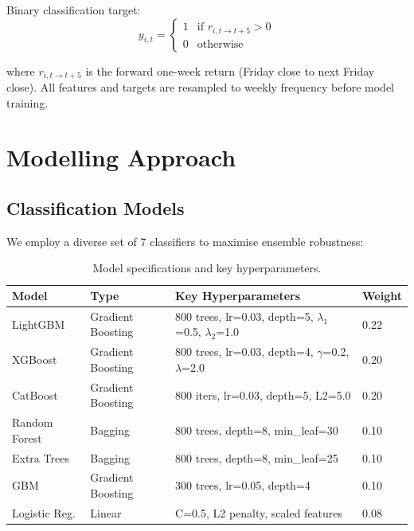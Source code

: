 \documentclass[12pt,a4paper]{article}
\begin{document}
Binary classification target:
\begin{equation}
    y_{i,t} = 
    \begin{cases}
        1 & \text{if } r_{i,t \to t+5} > 0 \\
        0 & \text{otherwise}
    \end{cases}
\end{equation}

where $r_{i,t \to t+5}$ is the forward one-week return (Friday close to next Friday close). All features and targets are resampled to weekly frequency before model training.

\section{Modelling Approach}

\subsection{Classification Models}
We employ a diverse set of 7 classifiers to maximise ensemble robustness:

\begin{table}[H]
\centering
\caption{Model specifications and key hyperparameters.}
\small
\begin{tabular}{llp{5cm}l}
\toprule
\textbf{Model} & \textbf{Type} & \textbf{Key Hyperparameters} & \textbf{Weight} \\
\midrule
LightGBM     & Gradient Boosting & 800 trees, lr=0.03, depth=5, $\lambda_1$=0.5, $\lambda_2$=1.0        & 0.22 \\
XGBoost      & Gradient Boosting & 800 trees, lr=0.03, depth=4, $\gamma$=0.2, $\lambda$=2.0             & 0.20 \\
CatBoost     & Gradient Boosting & 800 iters, lr=0.03, depth=5, L2=5.0                                  & 0.20 \\
Random Forest & Bagging          & 800 trees, depth=8, min\_leaf=30                                      & 0.10 \\
Extra Trees   & Bagging          & 800 trees, depth=8, min\_leaf=25                                      & 0.10 \\
GBM           & Gradient Boosting & 300 trees, lr=0.05, depth=4                                          & 0.10 \\
Logistic Reg. & Linear           & C=0.5, L2 penalty, scaled features                                    & 0.08 \\
\bottomrule
\end{tabular}
\end{table}
\end{document}
